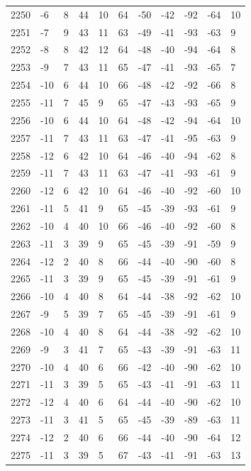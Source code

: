 \begin{table}[H]
\begin{tabular}{lllllllllll}
2250 & -6 & 8 & 44 & 10 & 64 & -50 & -42 & -92 & -64 & 10 \\
2251 & -7 & 9 & 43 & 11 & 63 & -49 & -41 & -93 & -63 & 9 \\
2252 & -8 & 8 & 42 & 12 & 64 & -48 & -40 & -94 & -64 & 8 \\
2253 & -9 & 7 & 43 & 11 & 65 & -47 & -41 & -93 & -65 & 7 \\
2254 & -10 & 6 & 44 & 10 & 66 & -48 & -42 & -92 & -66 & 8 \\
2255 & -11 & 7 & 45 & 9 & 65 & -47 & -43 & -93 & -65 & 9 \\
2256 & -10 & 6 & 44 & 10 & 64 & -48 & -42 & -94 & -64 & 10 \\
2257 & -11 & 7 & 43 & 11 & 63 & -47 & -41 & -95 & -63 & 9 \\
2258 & -12 & 6 & 42 & 10 & 64 & -46 & -40 & -94 & -62 & 8 \\
2259 & -11 & 7 & 43 & 11 & 63 & -47 & -41 & -93 & -61 & 9 \\
2260 & -12 & 6 & 42 & 10 & 64 & -46 & -40 & -92 & -60 & 10 \\
2261 & -11 & 5 & 41 & 9 & 65 & -45 & -39 & -93 & -61 & 9 \\
2262 & -10 & 4 & 40 & 10 & 66 & -46 & -40 & -92 & -60 & 8 \\
2263 & -11 & 3 & 39 & 9 & 65 & -45 & -39 & -91 & -59 & 9 \\
2264 & -12 & 2 & 40 & 8 & 66 & -44 & -40 & -90 & -60 & 8 \\
2265 & -11 & 3 & 39 & 9 & 65 & -45 & -39 & -91 & -61 & 9 \\
2266 & -10 & 4 & 40 & 8 & 64 & -44 & -38 & -92 & -62 & 10 \\
2267 & -9 & 5 & 39 & 7 & 65 & -45 & -39 & -91 & -61 & 9 \\
2268 & -10 & 4 & 40 & 8 & 64 & -44 & -38 & -92 & -62 & 10 \\
2269 & -9 & 3 & 41 & 7 & 65 & -43 & -39 & -91 & -63 & 11 \\
2270 & -10 & 4 & 40 & 6 & 66 & -42 & -40 & -90 & -62 & 10 \\
2271 & -11 & 3 & 39 & 5 & 65 & -43 & -41 & -91 & -63 & 11 \\
2272 & -12 & 4 & 40 & 6 & 64 & -44 & -40 & -90 & -62 & 10 \\
2273 & -11 & 3 & 41 & 5 & 65 & -45 & -39 & -89 & -63 & 11 \\
2274 & -12 & 2 & 40 & 6 & 66 & -44 & -40 & -90 & -64 & 12 \\
2275 & -11 & 3 & 39 & 5 & 67 & -43 & -41 & -91 & -63 & 13 \\

\end{tabular}
\end{table}
